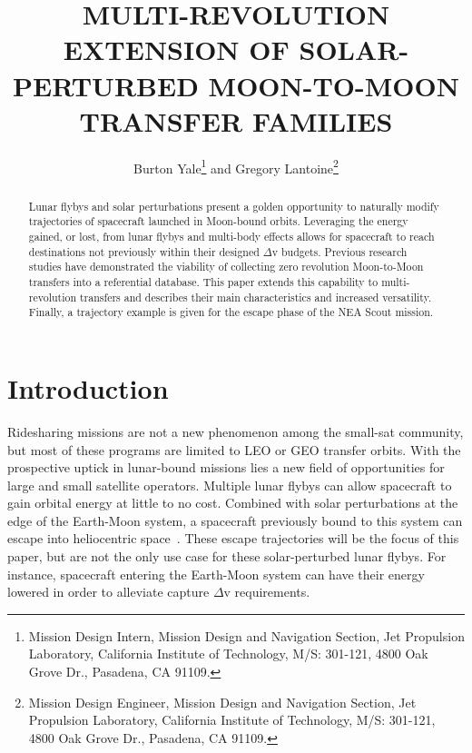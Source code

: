 \documentclass[letterpaper, paper,11pt]{AAS}	%
\begin{document}
 

\title{MULTI-REVOLUTION EXTENSION OF SOLAR-PERTURBED MOON-TO-MOON TRANSFER FAMILIES}

\author{Burton Yale\thanks{Mission Design Intern, Mission Design and Navigation Section, Jet Propulsion Laboratory, California Institute of
Technology, M/S: 301-121, 4800 Oak Grove Dr., Pasadena, CA 91109.}\; and 
    Gregory Lantoine\thanks{Mission Design Engineer, Mission Design and Navigation Section, Jet Propulsion Laboratory, California Institute of
Technology, M/S: 301-121, 4800 Oak Grove Dr., Pasadena, CA 91109.}}

\maketitle{}

\begin{abstract}
Lunar flybys and solar perturbations present a golden opportunity to naturally modify trajectories of spacecraft launched in Moon-bound orbits. Leveraging the energy gained, or lost, from lunar flybys and multi-body effects allows for spacecraft to reach destinations not previously within their designed \(\Delta \)v budgets. Previous research studies have demonstrated the viability of collecting zero revolution Moon-to-Moon transfers into a referential database. This paper extends this capability to multi-revolution transfers and describes their main characteristics and increased versatility. Finally, a trajectory example is given for the escape phase of the NEA Scout mission.
\end{abstract}

\section*{Introduction}


Ridesharing missions are not a new phenomenon among the small-sat community, but most of these programs are limited to LEO or GEO transfer orbits. With the prospective uptick in lunar-bound missions lies a new field of opportunities for large and small satellite operators. Multiple lunar flybys can allow spacecraft to gain orbital energy at little to no cost. Combined with solar perturbations at the edge of the Earth-Moon system, a spacecraft previously bound to this system can escape into heliocentric space~\cite{Mcelrath2012, Yarnoz2016, Chen2016, Chen2017}. These escape trajectories will be the focus of this paper, but are not the only use case for these solar-perturbed lunar flybys. For instance, spacecraft entering the Earth-Moon system can have their energy lowered in order to alleviate capture \(\Delta\)v requirements.
\end{document}
